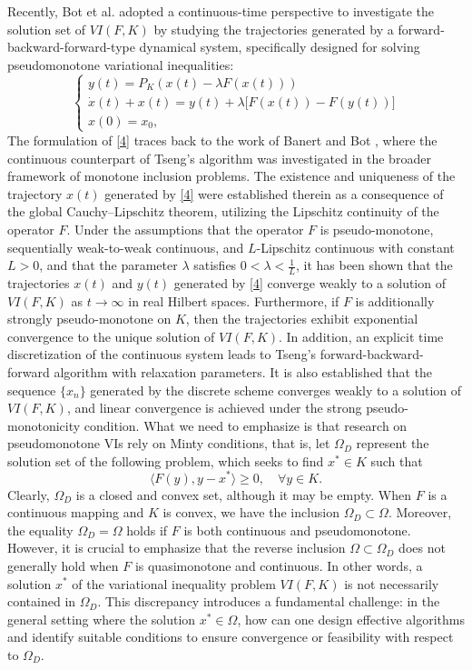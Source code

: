 \documentclass[hidelinks,11 pt]{article}
\numberwithin{equation}{section}
\theoremstyle{definition}  %
\numberwithin{equation}{section}
\numberwithin{theorem}{section}
\begin{document}
\vskip 2mm 
Recently, Bot et al.\cite{a22} adopted a continuous-time perspective to investigate the solution set of \( VI(F, K) \) by studying the trajectories generated by a forward-backward-forward-type dynamical system, specifically designed for solving pseudomonotone variational inequalities:
\begin{equation} \label{4}
    \begin{cases}
y(t) = P_K(x(t) - \lambda F(x(t))) \\ 
\dot{x}(t) + x(t) = y(t) + \lambda \big[F(x(t)) - F(y(t))\big] \\ 
x(0) = x_0, 
\end{cases}
\end{equation}
The formulation of \eqref{4} traces back to the work of Banert and Bot \cite{a23}, where the continuous counterpart of Tseng’s algorithm was investigated in the broader framework of monotone inclusion problems. The existence and uniqueness of the trajectory \( x(t) \) generated by \eqref{4} were established therein as a consequence of the global Cauchy--Lipschitz theorem, utilizing the Lipschitz continuity of the operator \( F \).    
Under the assumptions that the operator $F$ is pseudo-monotone, sequentially weak-to-weak continuous, and $L$-Lipschitz continuous with constant $L>0$, and that the parameter $\lambda$ satisfies $0<\lambda<\frac{1}{L}$, it has been shown that the trajectories $x(t)$ and $y(t)$ generated by \eqref{4} converge weakly to a solution of $VI(F,K)$ as $t\to\infty$ in real Hilbert spaces. Furthermore, if $F$ is additionally strongly pseudo-monotone on $K$, then the trajectories exhibit exponential convergence to the unique solution of $VI(F,K)$. 
In addition, an explicit time discretization of the continuous system leads to Tseng's forward-backward-forward algorithm with relaxation parameters. It is also established that the sequence $\{x_n\}$ generated by the discrete scheme converges weakly to a solution of $VI(F,K)$, and linear convergence is achieved under the strong pseudo-monotonicity condition.
\vskip 2mm 
What we need to emphasize is that research on pseudomonotone VIs rely on Minty conditions, that is, let \( \Omega_{D} \) represent the solution set of the following problem, which seeks to find \( x^* \in K \) such that
\begin{equation}
    \langle F(y), y - x^* \rangle \geq 0, \quad \forall y \in K.
\end{equation}
Clearly, \( \Omega_D \) is a closed and convex set, although it may be empty. When \( F \) is a continuous mapping and \( K \) is convex, we have the inclusion \( \Omega_D \subset \Omega \). Moreover, the equality \( \Omega_D = \Omega \) holds if \( F \) is both continuous and pseudomonotone. However, it is crucial to emphasize that the reverse inclusion \( \Omega \subset \Omega_D \) does not generally hold when \( F \) is quasimonotone and continuous. In other words, a solution \( x^* \) of the variational inequality problem \(VI(F, K) \) is not necessarily contained in \( \Omega_D \). This discrepancy introduces a fundamental challenge: in the general setting where the solution \( x^* \in \Omega \), how can one design effective algorithms and identify suitable conditions to ensure convergence or feasibility with respect to \( \Omega_D \). 
\end{document}

